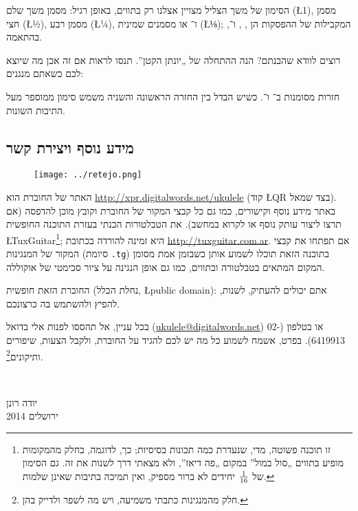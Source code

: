 הסימון של משך הצליל מצויין אצלנו רק בתווים, באופן רגיל:  מסמן משך שלם (\L{1}),  מסמן חצי (\L{½}),  מסמן רבע (\L{¼}), ו־ או  מסמנים שמינית (\L{⅛}); המקבילות של ההפסקות הן , ,  ו־, בהתאמה.

רוצים לוודא שהבנתם? הנה ההתחלה של „יונתן הקטן”. תנסו לראות אם זה אכן מה שיוצא לכם כשאתם מנגנים:

\begin{center}
\end{center}

חזרות מסומנות ב־ ו־. כשיש הבדל בין החזרה הראשונה והשניה משמש סימון  ממוספר מעל התיבות השונות.



\subsection*{מידע נוסף ויצירת קשר}

\begin{wrapfigure}[4]{l}{1.75cm}\vspace{-\baselineskip}\texttt{[image: ../retejo.png]}\end{wrapfigure}
	האתר של החוברת הוא \url{http://xpr.digitalwords.net/ukulele} (קוד \L{QR} בצד שמאל). באתר מידע נוסף וקישורים, כמו גם כל קבצי המקור של החוברת וקובץ מוכן להדפסה (אם תרצו ליצור עותק נוסף או לקרוא במחשב). את הטבלטורות הכנתי בעזרת התוכנה החופשית \L{TuxGuitar}\footnote{זו תוכנה פשוטה, מדי, שנעדרת כמה תכונות בסיסיות; כך, לדוגמה, בחלק מהמקומות מופיע בתווים „סול במול” במקום „פה דיאז”, ולא מצאתי דרך לשנות את זה. גם הסימון של ${1}\over{16}$ יחידים לא ברור מספיק, ואין תמיכה בתיבות שאינן שלמות.}; היא זמינה להורדה בכתובת \url{http://tuxguitar.com.ar}. אם תפתחו את קבצי המקור של המנגינות (סיומת \texttt{.tg}) בתוכנה הזאת תוכלו לשמוע אותן כשבזמן אמת מסומן המקום המתאים בטבלטורה ובתווים, כמו גם אופן הנגינה על ציור סכימטי של אוקוללה.

החוברת הזאת חופשית (נחלת הכלל, \L{public domain}): אתם יכולים להעתיק, לשנות, להפיץ ולהשתמש בה כרצונכם.

בכל עניין, אל תהססו לפנות אלי בדואל (\url{ukulele@digitalwords.net}) או בטלפון (02-6419913). בפרט, אשמח לשמוע כל מה יש לכם להגיד על החוברת, ולקבל הצעות, שיפורים ותיקונים\footnote{חלק מהמנגינות כתבתי משמיעה, ויש מה לשפר ולדייק בהן.}.

\vspace{\baselineskip}
~\hfill
\begin{minipage}{3cm}
	יודה רונן\\
	ירושלים 2014\\
\end{minipage}

